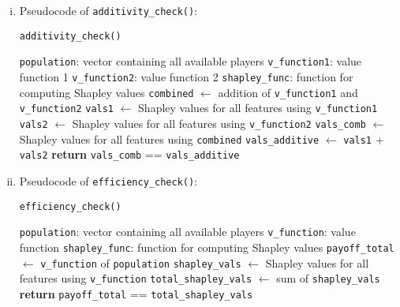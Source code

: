 {\begin{enumerate}[a)]
\begin{enumerate}[(i)]
	\item Pseudocode of \texttt{additivity\_check()}:
	
	\begin{algorithm}[H]
		\caption{\texttt{additivity\_check()}}
		\begin{algorithmic}[1]
			\Require \texttt{population}: vector containing all available players
			\Require \texttt{v\_function1}: value function 1
			\Require \texttt{v\_function2}: value function 2
			\Require \texttt{shapley\_func}: function for computing Shapley values
			\State \texttt{combined} $\gets$ addition of \texttt{v\_function1} and \texttt{v\_function2}
			\State \texttt{vals1} $\gets$ Shapley values for all features using \texttt{v\_function1}
			\State \texttt{vals2} $\gets$ Shapley values for all features using \texttt{v\_function2}
			\State \texttt{vals\_comb} $\gets$ Shapley values for all features using \texttt{combined}
			\State \texttt{vals\_additive} $\gets$ \texttt{vals1} + \texttt{vals2}
			\State \textbf{return} \texttt{vals\_comb} == \texttt{vals\_additive}
		\end{algorithmic}
	\end{algorithm}

	\item Pseudocode of \texttt{efficiency\_check()}:
	
	\begin{algorithm}[H]
		\caption{\texttt{efficiency\_check()}}
		\begin{algorithmic}[1]
			\Require \texttt{population}: vector containing all available players
			\Require \texttt{v\_function}: value function
			\Require \texttt{shapley\_func}: function for computing Shapley values
			\State \texttt{payoff\_total} $\gets$ \texttt{v\_function} of \texttt{population}
			\State \texttt{shapley\_vals} $\gets$ Shapley values for all features using \texttt{v\_function}
			\State \texttt{total\_shapley\_vals} $\gets$ sum of \texttt{shapley\_vals}
			\State \textbf{return} \texttt{payoff\_total} == \texttt{total\_shapley\_vals}
		\end{algorithmic}
	\end{algorithm}
	\end{enumerate}
\end{enumerate}


}

